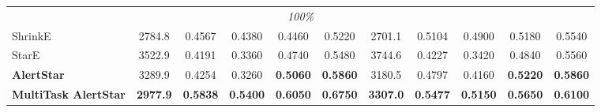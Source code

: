 \documentclass[10pt,journal,compsoc]{IEEEtran}
\begin{document}
\begin{table}[t]
\begin{tabular}{l ccccc ccccc}
\multicolumn{11}{c}{\textit{100\%}} \\
\cmidrule{1-11}
ShrinkE         & 2784.8 & 0.4567 & 0.4380 & 0.4460 & 0.5220 & 2701.1 & 0.5104 & 0.4900 & 0.5180 & 0.5540 \\
StarE           & 3522.9 & 0.4191 & 0.3360 & 0.4740 & 0.5480 & 3744.6 & 0.4227 & 0.3420 & 0.4840 & 0.5560 \\
\textbf{AlertStar}       & 3289.9 & 0.4254 & 0.3260 & \textbf{0.5060} & \textbf{0.5860} & 3180.5 & 0.4797 & 0.4160 & \textbf{0.5220} & \textbf{0.5860} \\
\textbf{MultiTask AlertStar} & \textbf{2977.9} & \textbf{0.5838} & \textbf{0.5400} & \textbf{0.6050} & \textbf{0.6750} & \textbf{3307.0} & \textbf{0.5477} & \textbf{0.5150} & \textbf{0.5650} & \textbf{0.6100} \\
\bottomrule
\end{tabular}
\end{table}



\end{document}
